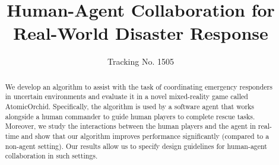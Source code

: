 \documentclass[letterpaper]{article}
\begin{document}
\setlength{\abovecaptionskip}{2pt}
\setlength{\belowcaptionskip}{-6pt}
\setlength{\abovedisplayskip}{0pt}
\setlength{\belowdisplayskip}{0pt}
\setlength{\floatsep}{0pt}
\setlength{\textfloatsep}{10pt}
%

\title{Human-Agent Collaboration for Real-World Disaster Response}
\author{Tracking No. 1505}

 \maketitle

\begin{abstract}
We develop an algorithm to assist with the task of coordinating emergency responders in uncertain environments and evaluate it in a novel mixed-reality game called AtomicOrchid. Specifically, the algorithm is used by a software  agent that works alongside a human commander to guide human players to complete rescue tasks. Moreover, we study the interactions between the human players and the agent in real-time and show that our algorithm improves  performance significantly (compared to a non-agent setting). Our results allow us to specify design guidelines for human-agent collaboration in such settings.
 \end{abstract}\vspace{-3mm}



\vspace{-2mm}


\vspace{-2mm}



\clearpage

\fontsize{9.5pt}{10.5pt}
{


}
\end{document}
